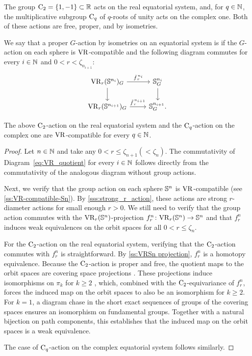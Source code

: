 The group \(\mathrm{C}_2 = \{1,-1\} \subset \mathbb{R}\) acts on the real equatorial system, and, for \(q \in \mathbb{N}\), the multiplicative subgroup \(\mathrm{C}_q\) of \(q\)-roots of unity acts on the complex one.
Both of these actions are free, proper, and by isometries.

We say that a proper \(G\)-action by isometries on an equatorial system is  if the \(G\)-action on each sphere is \(\mathrm{VR}\)-compatible and the following diagram commutes for every \(i \in \mathbb{N}\) and $0 < r < \zeta_{n_{i+1}}$:
\begin{equation}\label{eq:VR_quotient}
	\begin{tikzcd}
		\VR_r(\bS^{n_i})_G
		\ar[d]
		\ar[r, "\tilde f_{\,r}^{\,n_i}" above]
		&
		\bS^{n_i}_G
		\ar[d]
		\\
		\VR_r(\bS^{n_{i+1}})_G
		\ar[r, "\tilde f_{\,r}^{\,n_{i+1}}" above]
		&
		\bS^{n_{i+1}}_G.
	\end{tikzcd}
\end{equation}

\lemma The above \(\mathrm{C}_2\)-action on the real equatorial system and the \(\mathrm{C}_q\)-action on the complex one are \(\mathrm{VR}\)-compatible for every \(q \in \mathbb{N}\).

\begin{proof}
	Let $n \in \mathbb{N}$ and take any $0 < r \leq \zeta_{n+1} (< \zeta_{n})$.
	The commutativity of Diagram~\ref{eq:VR_quotient} for every $i \in \mathbb{N}$ follows directly from the commutativity of the analogous diagram without group actions.

	Next, we verify that the group action on each sphere $\mathbb{S}^n$ is \(\mathrm{VR}\)-compatible (see \cref{ss:VR-compatible-Sn}).
	By \cref{sss:strong_r_action}, these actions are strong \(r\)-diameter actions for small enough $r>0$.
	We still need to verify that the group action commutes with the $\mathrm{VR}_r(\mathbb{S}^{n})$-projection $f_r^{n}\colon \mathrm{VR}_r(\mathbb{S}^{n}) \to \mathbb{S}^{n}$ and that $f_r^{n}$ induces weak equivalences on the orbit spaces for all $0 < r \leq \zeta_{n}$.

	For the $\mathrm{C}_2$-action on the real equatorial system, verifying that the $\mathrm{C}_2$-action commutes with $f_r^{n}$ is straightforward.
	By \cref{ss:VRSn projection}, $f_r^{n}$ is a homotopy equivalence.
	Because the \(\mathrm{C}_2\)-action is proper and free, the quotient maps to the orbit spaces are covering space projections \cite[Proposition~1.40]{hatcher2000}.
	These projections induce isomorphisms on \(\pi_k\) for \(k \ge 2\) \cite[Proposition~4.1]{hatcher2000}, which, combined with the \(\mathrm{C}_2\)-equivariance of $f_r^n$, forces the induced map on the orbit spaces to also be an isomorphism for \(k \ge 2\).
	For \(k=1\), a diagram chase in the short exact sequences of groups of the covering spaces ensures an isomorphism on fundamental groups.
	Together with a natural bijection on path components, this establishes that the induced map on the orbit spaces is a weak equivalence.

	The case of $\mathrm{C}_q$-action on the complex equatorial system follows similarly.
\end{proof}

